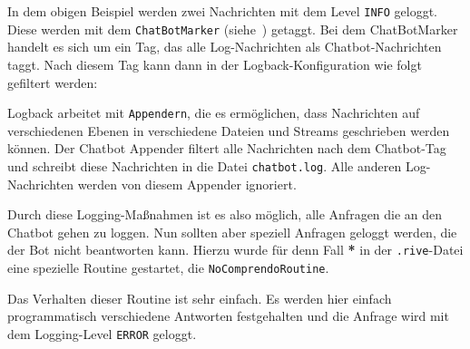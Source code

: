 In dem obigen Beispiel werden zwei Nachrichten mit dem Level \texttt{INFO} geloggt. Diese werden mit dem \texttt{ChatBotMarker} (siehe~) getaggt. Bei dem ChatBotMarker handelt es sich um ein Tag, das alle Log-Nachrichten als Chatbot-Nachrichten taggt. Nach diesem Tag kann dann in der Logback-Konfiguration wie folgt gefiltert werden:


Logback arbeitet mit \texttt{Appendern}, die es ermöglichen, dass Nachrichten auf verschiedenen Ebenen in verschiedene Dateien und Streams geschrieben werden können. Der Chatbot Appender filtert alle Nachrichten nach dem Chatbot-Tag und schreibt diese Nachrichten in die Datei \texttt{chatbot.log}. Alle anderen Log-Nachrichten werden von diesem Appender ignoriert.

Durch diese Logging-Maßnahmen ist es also möglich, alle Anfragen die an den Chatbot gehen zu loggen. Nun sollten aber speziell Anfragen geloggt werden, die der Bot nicht beantworten kann. Hierzu wurde für denn Fall \textbf{*} in der \texttt{.rive}-Datei eine spezielle Routine gestartet, die \texttt{NoComprendoRoutine}.
\newpage


Das Verhalten dieser Routine ist sehr einfach. Es werden hier einfach programmatisch verschiedene Antworten festgehalten und die Anfrage wird mit dem Logging-Level \texttt{ERROR} geloggt.
